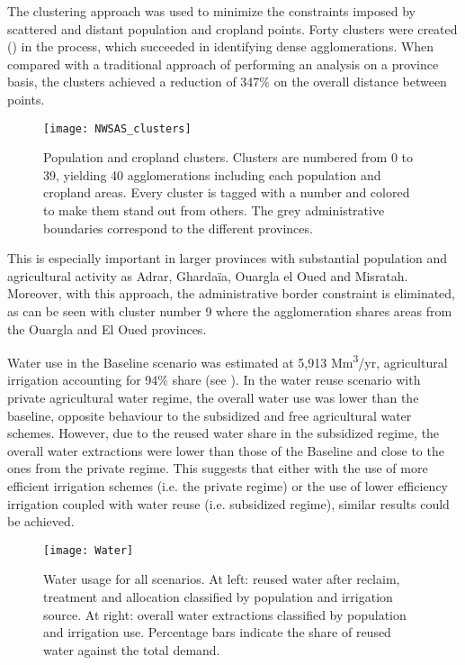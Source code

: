 The clustering approach was used to minimize the constraints imposed by scattered and distant population and cropland points. Forty clusters were created () in the process, which succeeded in identifying dense agglomerations. When compared with a traditional approach of performing an analysis on a province basis, the clusters achieved a reduction of 347\% on the overall distance between points.

\begin{figure*}[!h]
    \centering
	\texttt{[image: NWSAS\_clusters]}
	\caption{Population and cropland clusters. Clusters are numbered from 0 to 39, yielding 40 agglomerations including each population and cropland areas. Every cluster is tagged with a number and colored to make them stand out from others. The grey administrative boundaries correspond to the different provinces.}
	\label{fig:clusters}
\end{figure*}

This is especially important in larger provinces with substantial population and agricultural activity as Adrar, Ghardaïa, Ouargla el Oued and Misratah. Moreover, with this approach, the administrative border constraint is eliminated, as can be seen with cluster number 9 where the agglomeration shares areas from the Ouargla and El Oued provinces. 

Water use in the Baseline scenario was estimated at 5,913 Mm\textsuperscript{3}/yr, agricultural irrigation accounting for 94\% share (see ). In the water reuse scenario with private agricultural water regime, the overall water use was lower than the baseline, opposite behaviour to the subsidized and free agricultural water schemes. However, due to the reused water share in the subsidized regime, the overall water extractions were lower than those of the Baseline and close to the ones from the private regime. This suggests that either with the use of more efficient irrigation schemes (i.e. the private regime) or the use of lower efficiency irrigation coupled with water reuse (i.e. subsidized regime), similar results could be achieved.

\begin{figure*}[!ht]
	\centering
	\texttt{[image: Water]}
	\caption{Water usage for all scenarios. At left: reused water after reclaim, treatment and allocation classified by population and irrigation source. At right: overall water extractions classified by population and irrigation use. Percentage bars indicate the share of reused water against the total demand.}
	\label{fig:water}
\end{figure*}

